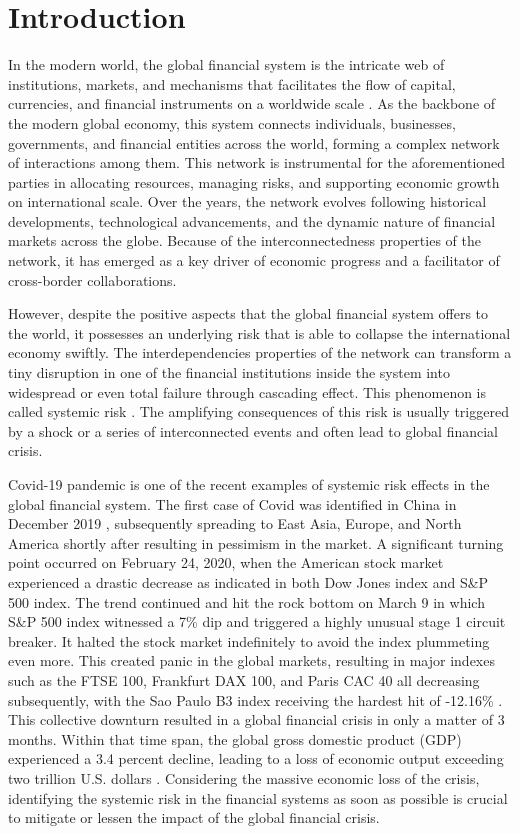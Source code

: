 \documentclass[a4paper,11pt]{article}
\begin{document}
\section{Introduction}
In the modern world, the global financial system is the intricate web of institutions, markets, and mechanisms that facilitates the flow of capital, currencies, and financial instruments on a worldwide scale \cite{FinancialSystem}. As the backbone of the modern global economy, this system connects individuals, businesses, governments, and financial entities across the world, forming a complex network of interactions among them. This network is instrumental for the aforementioned parties in allocating resources, managing risks, and supporting economic growth on international scale. Over the years, the network evolves following historical developments, technological advancements, and the dynamic nature of financial markets across the globe. Because of the interconnectedness properties of the network, it has emerged as a key driver of economic progress and a facilitator of cross-border collaborations.

However, despite the positive aspects that the global financial system offers to the world, it possesses an underlying risk that is able to collapse the international economy swiftly. The interdependencies properties of the network can transform a tiny disruption in one of the financial institutions inside the system into widespread or even total failure through cascading effect. This phenomenon is called systemic risk \cite{SystemicRisk}. The amplifying consequences of this risk is usually triggered by a shock or a series of interconnected events and often lead to global financial crisis.

Covid-19 pandemic is one of the recent examples of systemic risk effects in the global financial system. The first case of Covid was identified in China in December 2019 \cite{WHOTimeline}, subsequently spreading to East Asia, Europe, and North America shortly after resulting in pessimism in the market. A significant turning point occurred on February 24, 2020, when the American stock market experienced a drastic decrease as indicated in both Dow Jones index and S\&P 500 index. The trend continued and hit the rock bottom on March 9 in which S\&P 500 index witnessed a 7\% dip and triggered a highly unusual stage 1 circuit breaker. It halted the stock market indefinitely to avoid the index plummeting even more. This created panic in the global markets, resulting in major indexes such as the FTSE 100, Frankfurt DAX 100, and Paris CAC 40 all decreasing subsequently, with the Sao Paulo B3 index receiving the hardest hit of -12.16\%  \cite{IndexDuringCovid}. This collective downturn resulted in a global financial crisis in only a matter of 3 months. Within that time span, the global gross domestic product (GDP) experienced a 3.4 percent decline, leading to a loss of economic output exceeding two trillion U.S. dollars \cite{GDPImpact}. Considering the massive economic loss of the crisis, identifying the systemic risk in the financial systems as soon as possible is crucial to mitigate or lessen the impact of the global financial crisis.
\end{document}
